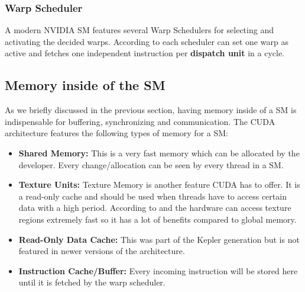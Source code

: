 \documentclass[draft, final]{vutinfth} %
\begin{document}
			\subsubsection{Warp Scheduler}
				A modern NVIDIA SM features several Warp Schedulers for selecting and activating the decided warps. According to \cite{nvidia_kepler_2012} each scheduler can set one warp as active and fetches one independent instruction per \textbf{dispatch unit} in a cycle.

			\subsection{Memory inside of the SM}
				As we briefly discussed in the previous section, having memory inside of a SM is indispensable for buffering, synchronizing and communication. The CUDA architecture features the following types of memory for a SM:

				\begin{itemize}
					\item \textbf{Shared Memory:} This is a very fast memory which can be allocated by the developer. Every change/allocation can be seen by every thread in a SM.

					\item \textbf{Texture Units:} Texture Memory is another feature CUDA has to offer. It is a read-only cache and should be used when threads have to access certain data with a high period. According to \cite{nvidia_kepler_2012} and \cite{Sanders:2010:CEI:1891996} the hardware can access texture regions extremely fast so it has a lot of benefits compared to global memory.

					\item \textbf{Read-Only Data Cache:} This was part of the Kepler generation but is not featured in newer versions of the architecture.

					\item \textbf{Instruction Cache/Buffer:} Every incoming instruction will be stored here until it is fetched by the warp scheduler.
				\end{itemize}
\end{document}
